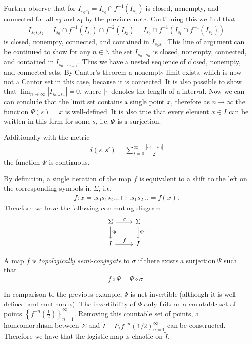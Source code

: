 \begin{ex}
Further observe that for $I_{s_0s_1}=I_{s_0}\cap f^{-1}(I_{s_1})$ is closed, nonempty, and connected for all $s_0$ and $s_1$ by the previous note. Continuing this we find that
\begin{align}
	I_{s_0s_1s_2} = I_{s_0} \cap f^{-1}(I_{s_1}) \cap f^{-2}(I_{s_2}) = I_{s_0} \cap f^{-1} \left( I_{s_1} \cap f^{-1}(I_{s_2})\right) 
\end{align}
is closed, nonempty, connected, and contained in $I _{s_0s_1}$. This line of argument can be continued to show for any $n \in \mathbb{N}$ the set $I_{s_0\ldots s_n}$ is closed, nonempty, connected, and contained in $I_{s_0 \ldots s_{n-1}}$. Thus we have a nested sequence of closed, nonempty, and connected sets. By Cantor's theorem a nonempty limit exists, which is now not a Cantor set in this case, because it is connected. It is also possible to show that $\lim_{n\to \infty }|I_{s_0 \ldots s_n}| = 0$, where $|\cdot|$ denotes the length of a interval. Now we can can conclude that the limit set contains a single point $x$, therefore as $n\to \infty $ the function $\Psi(s)=x$ is well-defined. It is also true that every element $x\in I$ can be written in this form for some $s$, i.e. $\Psi$ is a surjection.

 Additionally with the metric
 \begin{align}
	 d(s,s') = \sum_{i=0}^{\infty } \frac{|s_i - s'_i|}{2^{i}}	
 \end{align}
the function $\Psi$ is continuous. 

By definition, a single iteration of the map $f$ is equivalent to a shift to the left on the corresponding symbols in $\Sigma$, i.e.
\begin{align}
	f: x= \bm{.} s_0 s_1 s_2 \ldots \mapsto \bm{.} s_1 s_2 \ldots = f(x).
\end{align}
Therefore we have the following commuting diagram
\begin{equation}
\begin{tikzcd}
	\Sigma \arrow[r, "\sigma"] \arrow[d,"\Psi"] 
& \Sigma \arrow[d, "\Psi"] \\
I \arrow[r, "{f}"]
& I 
\end{tikzcd}.
\end{equation}
\begin{definition}
	A map $f$ is \emph{topologically semi-conjugate} to $\sigma$ if there exists a surjection $\Psi$ such that
	\begin{align}
		\boxed{
			f \circ \Psi = \Psi \circ \sigma.
		}
	\end{align}
\end{definition}

In comparison to the previous example, $\Psi$ is not invertible (although it is well-defined and continuous). The invertibility of $\Psi $ only fails on a countable set of points $\left \{ f^{-n}\left(\frac{1}{2}\right) \right \}_{n=1}^{\infty }$. Removing this countable set of points, a homeomorphism between $\Sigma$ and $\tilde{I}=I \setminus {f^{-n}(1/2)}_{n=1}^{\infty}$ can be constructed. Therefore we have that the logistic map is chaotic on $\tilde{I}$.
 \end{ex}

 
